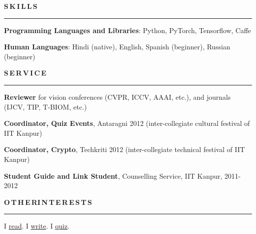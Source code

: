 \documentclass[11pt, a4paper]{article}
\begin{document}
\vspace{5pt}

\textbf{S\,K\,I\,L\,L\,S}
\vspace{5pt}
\hrule
\vspace{7pt}
\textbf{Programming Languages and Libraries}: Python, PyTorch, Tensorflow, Caffe

\textbf{Human Languages}: Hindi (native), English, Spanish (beginner), Russian (beginner)

\vspace{8pt}

\textbf{S\,E\,R\,V\,I\,C\,E}
\vspace{5pt}
\hrule
\vspace{7pt}
\textbf{Reviewer} for vision conferences (CVPR, ICCV, AAAI, etc.), and journals (IJCV, TIP,
T-BIOM, etc.)

\vspace{2pt}

\textbf{Coordinator, Quiz Events}, Antaragni 2012 (inter-collegiate cultural festival of IIT Kanpur)

\vspace{2pt}

\textbf{Coordinator, Crypto}, Techkriti 2012 (inter-collegiate technical festival of IIT Kanpur)

\vspace{2pt}

\textbf{Student Guide and Link Student}, Counselling Service, IIT Kanpur, 2011-2012

\vspace{8pt}
\textbf{O\,T\,H\,E\,R{\hspace{0.6em}}I\,N\,T\,E\,R\,E\,S\,T\,S}
\vspace{5pt}
\hrule
\vspace{7pt}
I \href{https://www.goodreads.com/user/show/25100820-ankan-bansal}{read}. I
\href{https://computervizion.blogspot.com/}{write}. I
\href{https://www.slideshare.net/AnkanBansal}{quiz}. %
\end{document}
